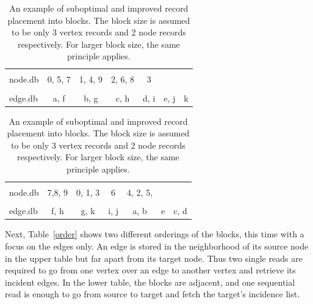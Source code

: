   
     \begin{table}[htp]
     \centering
    \begin{tabular}[c]{|l|c|c|c|c|c|c|} \hline
    &&&&&&\\[-1em]
     node.db & \colorbox{blue!30}{0}, \colorbox{red!30}{5}, \colorbox{green!30}{7} & \colorbox{blue!30}{1}, \colorbox{blue!30}{4}, \colorbox{green!30}{9} & \colorbox{blue!30}{2}, \colorbox{red!30}{6}, \colorbox{green!30}{8} & \colorbox{blue!30}{3} &  & \\ \hline
     &&&&&&\\[-1em]
     edge.db & \colorbox{blue!30}{a}, \colorbox{green!30}{f} & \colorbox{blue!30}{b}, \colorbox{green!30}{g} & \colorbox{blue!30}{c}, \colorbox{green!30}{h} & \colorbox{blue!30}{d}, \colorbox{green!30}{i} & \colorbox{red!30}{e}, \colorbox{green!30}{j} & \colorbox{green!30}{k} \\  \hline
    \end{tabular}
    \vspace{0.5cm}
    
    \begin{tabular}{|l | c | c | c | c | c | c|} \hline
    &&&&&&\\[-1em]
     node.db & \colorbox{green!30}{7},\colorbox{green!30}{8}, \colorbox{green!30}{9} & \colorbox{blue!30}{0}, \colorbox{blue!30}{1}, \colorbox{blue!30}{3} & \colorbox{red!30}{6} & \colorbox{blue!30}{4}, \colorbox{blue!30}{2}, \colorbox{red!30}{5},  &  & \\ \hline
     &&&&&&\\[-1em]
     edge.db &  \colorbox{green!30}{f}, \colorbox{green!30}{h} & \colorbox{green!30}{g}, \colorbox{green!30}{k} & \colorbox{green!30}{i}, \colorbox{green!30}{j} & \colorbox{blue!30}{a}, \colorbox{blue!30}{b} & \colorbox{red!30}{e} & \colorbox{blue!30}{c}, \colorbox{blue!30}{d} \\ \hline
    \end{tabular}
  \caption{An example of suboptimal and improved record placement into blocks. 
  The block size is assumed to be only 3 vertex records and 2 node records respectively. 
  For larger block size, the same principle applies.}
   \label{blocks}
   \end{table}
    
  Next, Table~\ref{order} shows two different orderings of the blocks, this time with a focus on the edges only. 
  An edge is stored in the neighborhood of its source node in the upper table but far apart from its target node.
  Thus two single reads are required to go from one vertex over an edge to another vertex and retrieve its incident edges. 
  In the lower table, the blocks are adjacent, and one sequential read is enough to go from source to target and fetch the target's incidence list.
  
